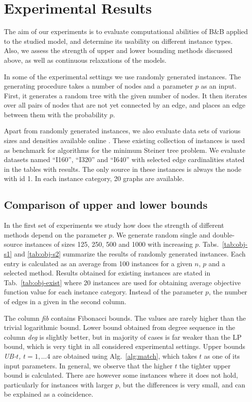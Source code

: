 \section{Experimental Results} \label{sec:exp}

The aim of our experiments is to evaluate computational abilities of B\&B applied to the studied model, and determine its usability on different instance types.
Also, we assess the strength of upper and lower bounding methods discussed above, as well as continuous relaxations of the models.

In some of the experimental settings we use randomly generated instances.
The generating procedure takes a number of nodes and a parameter $p$ as an input.
First, it generates a random tree with the given number of nodes.
It then iterates over all pairs of nodes that are not yet connected by an edge, and places an edge between them with the probability $p$.

Apart from randomly generated instances, we also evaluate data sets of various sizes and densities available online \cite{steinlib}.
These existing collection of instances is used as benchmark for algorithms for the minimum Steiner tree problem.
We evaluate datasets named ``I160'', ``I320'' and ``I640'' with selected edge cardinalities stated in the tables with results.
The only source in these instances is always the node with id 1.
In each instance category, 20 graphs are available.

\subsection{Comparison of upper and lower bounds}

In the first set of experiments we study how does the strength of different methods depend on the parameter $p$.
We generate random single and double-source instances of sizes 125, 250, 500 and 1000 with increasing $p$.
Tabs.~\ref{tab:obj-s1} and \ref{tab:obj-s2} summarize the results of randomly generated instances.
Each entry is calculated as an average from 100 instances for a given $n$, $p$ and a selected method.
Results obtained for existing instances are stated in Tab.~\ref{tab:obj-exist} where 20 instances are used for obtaining average objective function value for each instance category.
Instead of the parameter $p$, the number of edges in a given in the second column.

The column \emph{fib} contains Fibonacci bounds.
The values are rarely higher than the trivial logarithmic bound.
Lower bound obtained from degree sequence in the column \emph{deg} is slightly better, 
but in majority of cases is far weaker than the LP bound, which is very tight in all considered experimental settings.
Upper bounds \emph{UB-$t$, $t=1,\dots 4$} are obtained using Alg.~\ref{alg:match}, which takes $t$ as one of its input parameters.
In general, we observe that the higher $t$ the tighter upper bound is calculated.
There are however some instances where it does not hold, particularly for instances with larger $p$,  but the differences is very small, and can be explained as a coincidence.

